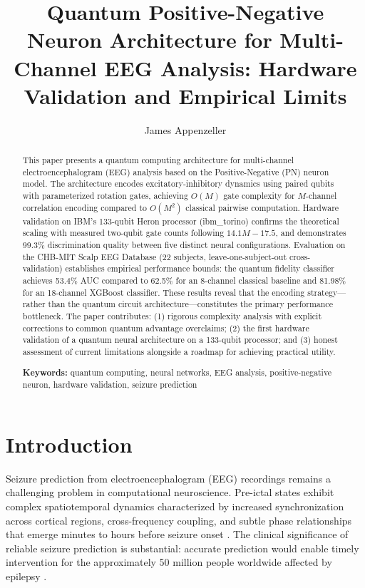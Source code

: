 \documentclass[11pt,a4paper]{article}
\title{Quantum Positive-Negative Neuron Architecture for Multi-Channel EEG Analysis: Hardware Validation and Empirical Limits}
\author{James Appenzeller}
\affil{Independent Researcher}
\date{}
\begin{document}
\raggedbottom

\maketitle

\begin{abstract}
This paper presents a quantum computing architecture for multi-channel electroencephalogram (EEG) analysis based on the Positive-Negative (PN) neuron model. The architecture encodes excitatory-inhibitory dynamics using paired qubits with parameterized rotation gates, achieving $O(M)$ gate complexity for $M$-channel correlation encoding compared to $O(M^2)$ classical pairwise computation. Hardware validation on IBM's 133-qubit Heron processor (ibm\_torino) confirms the theoretical scaling with measured two-qubit gate counts following $14.1M - 17.5$, and demonstrates 99.3\% discrimination quality between five distinct neural configurations. Evaluation on the CHB-MIT Scalp EEG Database (22 subjects, leave-one-subject-out cross-validation) establishes empirical performance bounds: the quantum fidelity classifier achieves 53.4\% AUC compared to 62.5\% for an 8-channel classical baseline and 81.98\% for an 18-channel XGBoost classifier. These results reveal that the encoding strategy---rather than the quantum circuit architecture---constitutes the primary performance bottleneck. The paper contributes: (1) rigorous complexity analysis with explicit corrections to common quantum advantage overclaims; (2) the first hardware validation of a quantum neural architecture on a 133-qubit processor; and (3) honest assessment of current limitations alongside a roadmap for achieving practical utility.

\textbf{Keywords:} quantum computing, neural networks, EEG analysis, positive-negative neuron, hardware validation, seizure prediction
\end{abstract}

\section{Introduction}

Seizure prediction from electroencephalogram (EEG) recordings remains a challenging problem in computational neuroscience. Pre-ictal states exhibit complex spatiotemporal dynamics characterized by increased synchronization across cortical regions, cross-frequency coupling, and subtle phase relationships that emerge minutes to hours before seizure onset \citep{mormann2007}. The clinical significance of reliable seizure prediction is substantial: accurate prediction would enable timely intervention for the approximately 50 million people worldwide affected by epilepsy \citep{who2019}.
\end{document}
